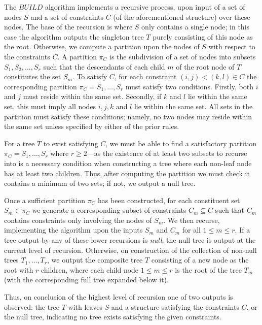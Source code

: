 \documentclass[a4paper, 11pt]{article}
\begin{document}
	The $BUILD$ algorithm implements a recursive process, upon input of a set of nodes $S$ and a set of constraints $C$ (of the aforementioned structure) over these nodes. The base of the recursion is where $S$ only contains a single node; in this case the algorithm outputs the singleton tree $T$ purely consisting of this node as the root. Otherwise, we compute a partition upon the nodes of $S$ with respect to the constraints $C$. A partition $\pi_{C}$ is the subdivision of a set of nodes into subsets $S_{1}, S_{2}, \ldots, S_{r}$ such that the descendants of each child $m$ of the root node of $T$ constitutes the set $S_{m}$. To satisfy $C$, for each constraint $(i, j) < (k, l) \in C$ the corresponding partition $\pi_{C} = S_{1}, \ldots, S_{r}$ must satisfy two conditions. Firstly, both $i$ and $j$ must reside within the same set. Secondly, if $k$ and $l$ lie within the same set, this must imply all nodes $i, j, k$ and $l$ lie within the same set. All sets in the partition must satisfy these conditions; namely, no two nodes may reside within the same set unless specified by either of the prior rules.
	
	For a tree $T$ to exist satisfying $C$, we must be able to find a satisfactory partition $\pi_{C} = S_{1}, \ldots, S_{r}$ where $r \geq 2$---as the existence of at least two subsets to recurse into is a necessary condition when constructing a tree where each non-leaf node has at least two children. Thus, after computing the partition we must check it contains a minimum of two sets; if not, we output a null tree.

	Once a sufficient partition $\pi_{C}$ has been constructed, for each constituent set $S_{m} \in \pi_{C}$ we generate a corresponding subset of constraints $C_{m} \subseteq C$ such that $C_{m}$ contains constraints only involving the nodes of $S_{m}$. We then recurse, implementing the algorithm upon the inputs $S_{m}$ and $C_{m}$ for all $1 \leq m \leq r$. If a tree output by any of these lower recursions is \emph{null}, the null tree is output at the current level of recursion. Otherwise, on construction of the collection of non-null trees $T_{1}, \ldots, T_{r}$, we output the composite tree $T$ consisting of a new node as the root with $r$ children, where each child node $1 \leq m \leq r$ is the root of the tree $T_{m}$ (with the corresponding full tree expanded below it).
	
	Thus, on conclusion of the highest level of recursion one of two outputs is observed: the tree $T$ with leaves $S$ and a structure satisfying the constraints $C$, or the null tree, indicating no tree exists satisfying the given constraints.
\end{document}

